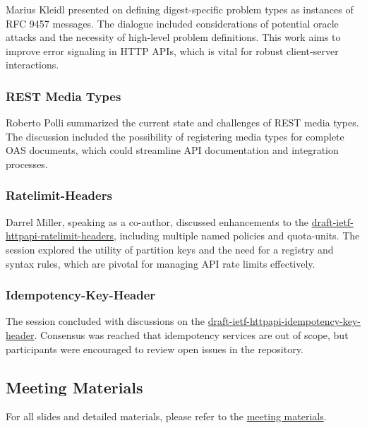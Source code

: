 \documentclass{article}
\begin{document}
Marius Kleidl presented on defining digest-specific problem types as instances of RFC 9457 messages. The dialogue included considerations of potential oracle attacks and the necessity of high-level problem definitions. This work aims to improve error signaling in HTTP APIs, which is vital for robust client-server interactions.

\subsubsection{REST Media Types}

Roberto Polli summarized the current state and challenges of REST media types. The discussion included the possibility of registering media types for complete OAS documents, which could streamline API documentation and integration processes.

\subsubsection{Ratelimit-Headers}

Darrel Miller, speaking as a co-author, discussed enhancements to the \href{https://datatracker.ietf.org/doc/html/draft-ietf-httpapi-ratelimit-headers}{draft-ietf-httpapi-ratelimit-headers}, including multiple named policies and quota-units. The session explored the utility of partition keys and the need for a registry and syntax rules, which are pivotal for managing API rate limits effectively.

\subsubsection{Idempotency-Key-Header}

The session concluded with discussions on the \href{https://datatracker.ietf.org/doc/html/draft-ietf-httpapi-idempotency-key-header}{draft-ietf-httpapi-idempotency-key-header}. Consensus was reached that idempotency services are out of scope, but participants were encouraged to review open issues in the repository.

\subsection{Meeting Materials}

For all slides and detailed materials, please refer to the \href{https://www.ietf.org/proceedings/121/httpapi.html}{meeting materials}.
\end{document}
